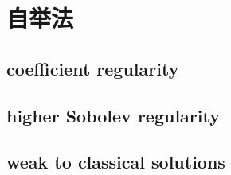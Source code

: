 \section{自举法}
\label{b2:sec:1602}


\subsection{coefficient regularity}
\label{b2:subsec:160201}

\subsection{higher Sobolev regularity}
\label{b2:subsec:160202}

\subsection{weak to classical solutions}
\label{b2:subsec:160203}


